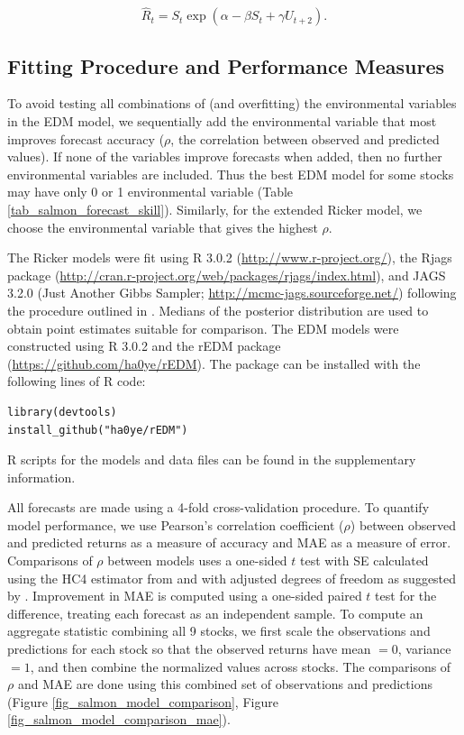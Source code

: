 \begin{equation}
\hat{R}_t = S_t \exp{(\alpha - \beta S_t + \gamma U_{t+2})}.
\end{equation}

\subsection{Fitting Procedure and Performance Measures}

To avoid testing all combinations of (and overfitting) the environmental variables in the EDM model, we sequentially add the environmental variable that most improves forecast accuracy ($\rho$, the correlation between observed and predicted values). If none of the variables improve forecasts when added, then no further environmental variables are included. Thus the best EDM model for some stocks may have only 0 or 1 environmental variable (Table \ref{tab_salmon_forecast_skill}). Similarly, for the extended Ricker model, we choose the environmental variable that gives the highest $\rho$.

The Ricker models were fit using R 3.0.2 (\url{http://www.r-project.org/}), the Rjags package (\url{http://cran.r-project.org/web/packages/rjags/index.html}), and \linebreak JAGS 3.2.0 (Just Another Gibbs Sampler; \url{http://mcmc-jags.sourceforge.net/}) following the procedure outlined in \cite{Grant_2010}. Medians of the posterior distribution are used to obtain point estimates suitable for comparison. The EDM models were constructed using R 3.0.2 and the rEDM package (\url{https://github.com/ha0ye/rEDM}). The package can be installed with the following lines of R code:
\begin{verbatim}
library(devtools)
install_github("ha0ye/rEDM")
\end{verbatim}
R scripts for the models and data files can be found in the supplementary information.

All forecasts are made using a 4-fold cross-validation procedure. To quantify model performance, we use Pearson's correlation coefficient ($\rho$) between observed and predicted returns as a measure of accuracy and MAE as a measure of error. Comparisons of $\rho$ between models uses a one-sided $t$ test with SE calculated using the HC4 estimator from \cite{Cribari-Neto_2004} and with adjusted degrees of freedom as suggested by \cite{Wilcox_2009}. Improvement in MAE is computed using a one-sided paired $t$ test for the difference, treating each forecast as an independent sample. To compute an aggregate statistic combining all 9 stocks, we first scale the observations and predictions for each stock so that the observed returns have mean $= 0$, variance $= 1$, and then combine the normalized values across stocks. The comparisons of $\rho$ and MAE are done using this combined set of observations and predictions (Figure \ref{fig_salmon_model_comparison}, Figure \ref{fig_salmon_model_comparison_mae}).


